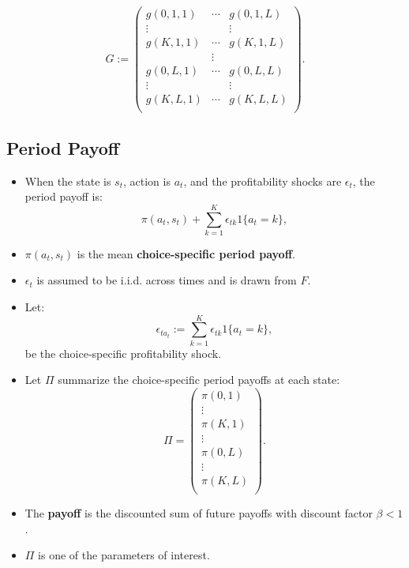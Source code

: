 \documentclass[
]{book}
\providecommand{\tightlist}{%
  \setlength{\itemsep}{0pt}\setlength{\parskip}{0pt}}
\begin{document}
\begin{equation}
G := 
\begin{pmatrix}
g(0, 1, 1) & \cdots & g(0, 1, L)\\
\vdots & & \vdots \\
g(K, 1, 1) & \cdots & g(K, 1, L)\\
& \vdots & \\
g(0, L, 1) & \cdots & g(0, L, L)\\
\vdots & & \vdots \\
g(K, L, 1) & \cdots & g(K, L, L)\\
\end{pmatrix}.
\end{equation}

\hypertarget{period-payoff}{%
\subsection{Period Payoff}\label{period-payoff}}

\begin{itemize}
\tightlist
\item
  When the state is \(s_t\), action is \(a_t\), and the profitability shocks are \(\epsilon_t\), the period payoff is:
  \begin{equation}
  \pi(a_t, s_t) + \sum_{k = 1}^K \epsilon_{tk} 1\{a_t = k\},
  \end{equation}
\item
  \(\pi(a_t, s_t)\) is the mean \textbf{choice-specific period payoff}.
\item
  \(\epsilon_t\) is assumed to be i.i.d. across times and is drawn from \(F\).
\item
  Let:
  \[
  \epsilon_{t a_t} := \sum_{k = 1}^K \epsilon_{tk} 1\{a_t = k\},
  \]
  be the choice-specific profitability shock.
\item
  Let \(\Pi\) summarize the choice-specific period payoffs at each state:
  \begin{equation}
  \Pi =
  \begin{pmatrix}
  \pi(0, 1)\\
  \vdots \\
  \pi(K, 1)\\
  \vdots \\
  \pi(0, L)\\
  \vdots \\
  \pi(K, L)\\
  \end{pmatrix}.
  \end{equation}
\item
  The \textbf{payoff} is the discounted sum of future payoffs with discount factor \(\beta < 1\).
\item
  \(\Pi\) is one of the parameters of interest.
\end{itemize}
\end{document}
